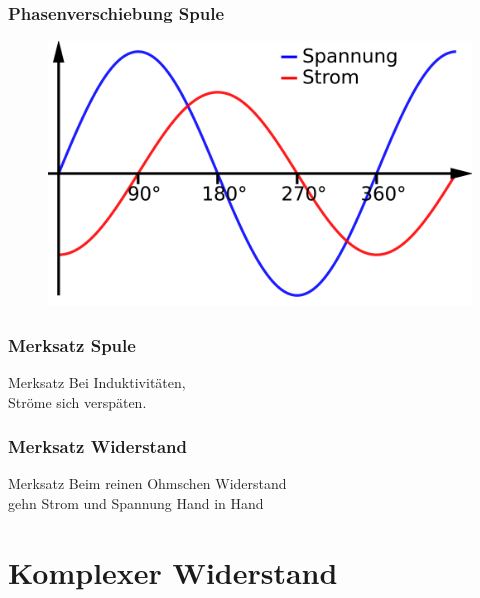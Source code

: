 \begin{frame}
  \frametitle{Phasenverschiebung Spule}
  \begin{center}
    \begin{figure}
      \includegraphics[width=1\textwidth,height=.75\textheight,keepaspectratio]{a03/Phasenverschiebung_induktiv.png}
    \end{figure}
  \end{center}
\end{frame}

\begin{frame}
  \frametitle{Merksatz Spule}
  \begin{block}{Merksatz}
    Bei Induktivitäten,\\
    Ströme sich verspäten.
  \end{block}
\end{frame}

\begin{frame}
  \frametitle{Merksatz Widerstand}
  \begin{block}{Merksatz}
    Beim reinen Ohmschen Widerstand\\
    gehn Strom und Spannung Hand in Hand
  \end{block}
\end{frame}

\section*{Komplexer Widerstand}

